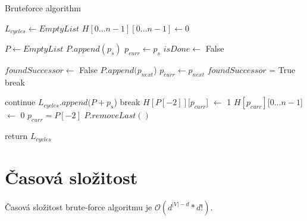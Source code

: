         \begin{algorithm}[h]
            \SetAlgoLined
            \caption{Bruteforce algorithm}
            $L_{cycles} \leftarrow  \mathit{EmptyList}$\;
            $H[0 \dots n-1][0 \dots n-1] \leftarrow 0$ 
            {
                $P \leftarrow  \mathit{EmptyList}$\;
                $P.append(p_s)$\;
                $p_{curr} \leftarrow p_s$\;
                $isDone \leftarrow$ False\;
                {
                    $foundSuccessor \leftarrow$ False\;
                    {
                        {
                        $P.append(p_{next}$)\;
                        $p_{curr} \leftarrow p_{next}$\;
                        $foundSuccessor$ = True\;
                        break
                        }
                    }

                    {
                        continue
                    }
                    {
                        {
                            $L_{cycles}.append(P+p_s$)
                        }
                        {
                            break
                        }
                        $H[P[-2]][p_{curr}$] $\leftarrow$ 1\;
                        $H[p_{curr}][0\dots n-1$] $\leftarrow$ 0\;
                        $p_{curr} = P[-2]$\;
                        $P.removeLast()$
                    }
                }
            }
            return $L_{cycles}$
        \end{algorithm}

    \section{Časová složitost}
        \begin{theorem}
            Časová složitost brute-force algoritmu je $\mathcal{O}(d^{|V|-d} * d!)$.
        \end{theorem}

